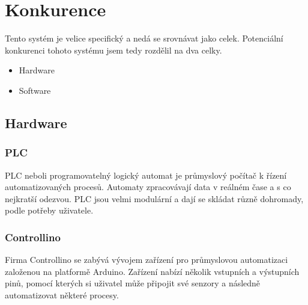 \chapter{Konkurence}
Tento systém je velice specifický a nedá se srovnávat jako celek. 
Potenciální konkurenci tohoto systému jsem tedy rozdělil na dva celky.

\begin{itemize} %
    \item Hardware
    \item Software
\end{itemize}



\section{Hardware}

\fxnote[author=JA]{\textcolor{mygreen}{Přidat obrázky}}

\subsection{PLC}
PLC neboli programovatelný logický automat je průmyslový počítač k řízení automatizovaných procesů.
Automaty zpracovávají data v reálném čase a s co nejkratší odezvou.
PLC jsou velmi modulární a dají se skládat různě dohromady, podle potřeby uživatele.



\subsection{Controllino}
Firma Controllino\cite{CONTROLLINO} se zabývá vývojem zařízení pro průmyslovou automatizaci založenou na platformě Arduino.
Zařízení nabízí několik vstupních a výstupních pinů, pomocí kterých si uživatel může připojit své senzory a následně automatizovat některé procesy. 




